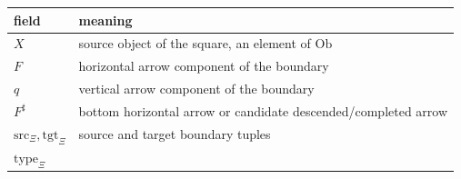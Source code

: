 \documentclass[11pt]{article}
\theoremstyle{definition}
\begin{document}
\begin{longtable}[]{@{}ll@{}}
\toprule
\begin{minipage}[b]{0.47\columnwidth}\raggedright
field\strut
\end{minipage} & \begin{minipage}[b]{0.47\columnwidth}\raggedright
meaning\strut
\end{minipage}\tabularnewline
\midrule
\endhead
\begin{minipage}[t]{0.47\columnwidth}\raggedright
\(X\)\strut
\end{minipage} & \begin{minipage}[t]{0.47\columnwidth}\raggedright
source object of the square, an element of \(\mathrm{Ob}\)\strut
\end{minipage}\tabularnewline
\begin{minipage}[t]{0.47\columnwidth}\raggedright
\(F\)\strut
\end{minipage} & \begin{minipage}[t]{0.47\columnwidth}\raggedright
horizontal arrow component of the boundary\strut
\end{minipage}\tabularnewline
\begin{minipage}[t]{0.47\columnwidth}\raggedright
\(q\)\strut
\end{minipage} & \begin{minipage}[t]{0.47\columnwidth}\raggedright
vertical arrow component of the boundary\strut
\end{minipage}\tabularnewline
\begin{minipage}[t]{0.47\columnwidth}\raggedright
\(F^{\sharp}\)\strut
\end{minipage} & \begin{minipage}[t]{0.47\columnwidth}\raggedright
bottom horizontal arrow or candidate descended/completed arrow\strut
\end{minipage}\tabularnewline
\begin{minipage}[t]{0.47\columnwidth}\raggedright
\(\mathrm{src}_{\Xi},\mathrm{tgt}_{\Xi}\)\strut
\end{minipage} & \begin{minipage}[t]{0.47\columnwidth}\raggedright
source and target boundary tuples\strut
\end{minipage}\tabularnewline
\begin{minipage}[t]{0.47\columnwidth}\raggedright
\(\mathrm{type}_{\Xi}\)\strut
\end{minipage} & \begin{minipage}[t]{0.47\columnwidth}\raggedright

\end{minipage}
\end{longtable}
\end{document}
